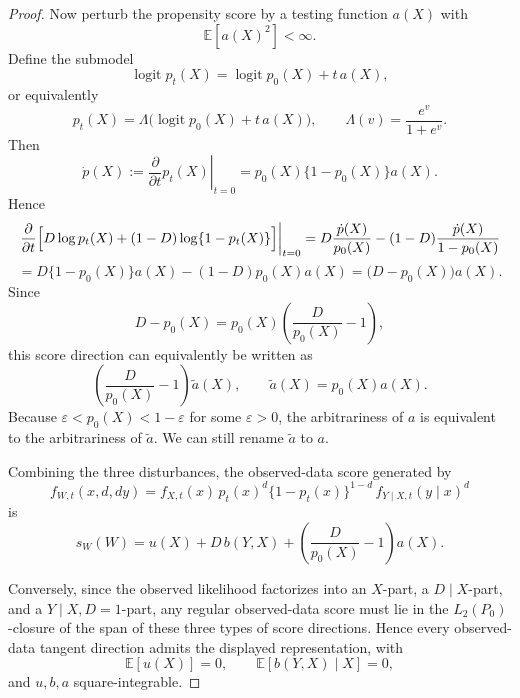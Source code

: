 \documentclass[12pt]{article}
\renewcommand{\(}{\left(}%
\renewcommand{\)}{\right)}%
\renewcommand{\[}{\left[}%
\renewcommand{\]}{\right]}%
\newtheorem{proof}{Proof.}}
\begin{document}
\begin{proof}
Now perturb the propensity score by a testing function $a(X)$ with
\begin{equation*}
\mathbb{E}[a(X)^2]<\infty.
\end{equation*}
Define the submodel
\begin{equation*}
\operatorname{logit} p_t(X)=\operatorname{logit} p_0(X)+t\,a(X),
\end{equation*}
or equivalently
\begin{equation*}
p_t(X)=\Lambda\bigl(\operatorname{logit} p_0(X)+t\,a(X)\bigr),
\qquad
\Lambda(v)=\frac{e^v}{1+e^v}.
\end{equation*}
Then
\begin{equation*}
\dot p(X):=\left.\frac{\partial}{\partial t}p_t(X)\right|_{t=0}
=
p_0(X)\{1-p_0(X)\}a(X).
\end{equation*}
Hence
\begin{equation*}
\left.\frac{\partial}{\partial t}
\Bigl[
D\log p_t(X)+(1-D)\log\{1-p_t(X)\}
\Bigr]\right|_{t=0}
=
D\frac{\dot p(X)}{p_0(X)}-(1-D)\frac{\dot p(X)}{1-p_0(X)}
\end{equation*}
\begin{equation*}
=
D\{1-p_0(X)\}a(X)-(1-D)p_0(X)a(X)
=
\bigl(D-p_0(X)\bigr)a(X).
\end{equation*}
Since
\begin{equation*}
D-p_0(X)=p_0(X)\left(\frac{D}{p_0(X)}-1\right),
\end{equation*}
this score direction can equivalently be written as
\begin{equation*}
\left(\frac{D}{p_0(X)}-1\right)\tilde a(X),
\qquad
\tilde a(X)=p_0(X)a(X).
\end{equation*}
Because $\varepsilon< p_0(X)<1-\varepsilon$ for some $\varepsilon>0$, the arbitrariness of $a$ is equivalent to the arbitrariness of $\tilde a$. We can still rename $\tilde a$ to $a$.

Combining the three disturbances, the observed-data score generated by
\begin{equation*}
f_{W,t}(x,d,dy)
=
f_{X,t}(x)\,
p_t(x)^d\{1-p_t(x)\}^{1-d}\,
f_{Y\mid X,t}(y\mid x)^d
\end{equation*}
is
\begin{equation*}
s_W(W)=u(X)+D\,b(Y,X)+\left(\frac{D}{p_0(X)}-1\right)a(X).
\end{equation*}

Conversely, since the observed likelihood factorizes into an $X$-part, a $D\mid X$-part, and a $Y\mid X,D=1$-part, any regular observed-data score must lie in the $L_2(P_0)$-closure of the span of these three types of score directions. Hence every observed-data tangent direction admits the displayed representation, with
\begin{equation*}
\mathbb{E}[u(X)]=0,
\qquad
\mathbb{E}[b(Y,X)\mid X]=0,
\end{equation*}
and $u,b,a$ square-integrable.


\end{proof}
\end{document}
